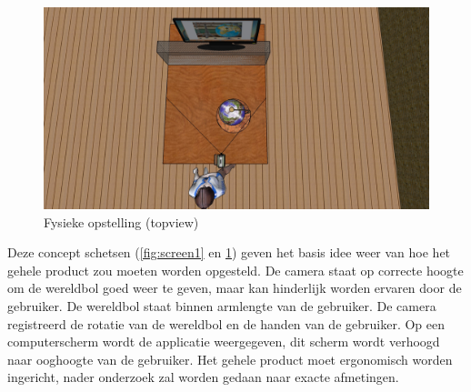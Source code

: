 \begin{figure}[h]
	\includegraphics[width=130mm]{figs/screen2.jpg}
	\caption{Fysieke opstelling (topview)}
	\label{fig:screen2}
\end{figure}

Deze concept schetsen (\cref{fig:screen1} en \cref{fig:screen2}) geven het basis idee weer van hoe het gehele product zou moeten worden opgesteld. De camera staat op correcte hoogte om de wereldbol goed weer te geven, maar kan hinderlijk worden ervaren door de gebruiker. De wereldbol staat binnen armlengte van de gebruiker. De camera registreerd de rotatie van de wereldbol en de handen van de gebruiker. Op een computerscherm wordt de applicatie weergegeven, dit scherm wordt verhoogd naar ooghoogte van de gebruiker. Het gehele product moet ergonomisch worden ingericht, nader onderzoek zal worden gedaan naar exacte afmetingen. 